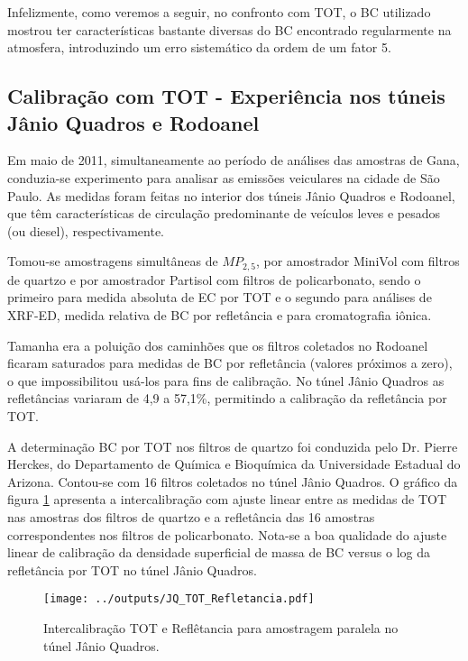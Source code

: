 Infelizmente, como veremos a seguir, no confronto com TOT, o BC utilizado 
mostrou ter características bastante diversas do BC encontrado regularmente 
na atmosfera, introduzindo um erro sistemático da ordem de um fator 5.  


\newpage
\subsection{Calibração com TOT - Experiência nos túneis Jânio Quadros e Rodoanel}

Em maio de 2011, simultaneamente ao período de análises das amostras de Gana, 
conduzia-se experimento para analisar as emissões veiculares na cidade de São 
Paulo. As medidas foram feitas no interior dos túneis Jânio Quadros e Rodoanel,
que têm características de circulação predominante de veículos leves e pesados 
(ou diesel), respectivamente. 

Tomou-se amostragens simultâneas de $MP_{2,5}$, por amostrador MiniVol com 
filtros de quartzo e por amostrador Partisol com filtros de policarbonato, 
sendo o primeiro para medida absoluta de EC por TOT e o segundo para análises
de XRF-ED, medida relativa de BC por refletância e para cromatografia iônica.

Tamanha era a poluição dos caminhões que os filtros coletados no Rodoanel 
ficaram saturados para medidas de BC por refletância (valores próximos a zero), 
o que impossibilitou usá-los para fins de calibração. No túnel Jânio Quadros as 
refletâncias variaram de 4,9 a 57,1\%, permitindo a calibração da refletância 
por TOT.

A determinação BC por TOT nos filtros de quartzo foi conduzida pelo Dr. Pierre 
Herckes, do Departamento de Química e Bioquímica da Universidade Estadual do 
Arizona. Contou-se com 16 filtros coletados no túnel Jânio Quadros. 
O gráfico da figura \ref{table:interJQ} apresenta a intercalibração com ajuste 
linear entre as medidas de TOT nas amostras dos filtros de quartzo e a 
refletância das 16 amostras correspondentes nos filtros de policarbonato.
Nota-se a boa qualidade do ajuste linear de calibração da densidade superficial 
de massa de BC versus o log da refletância por TOT no túnel Jânio Quadros. 

\begin{figure}[H]
  \centering
  \texttt{[image: ../outputs/JQ\_TOT\_Refletancia.pdf]}
  \caption{Intercalibração TOT e Reflêtancia para amostragem paralela no 
           túnel Jânio Quadros. \label{table:interJQ}}
\end{figure}


